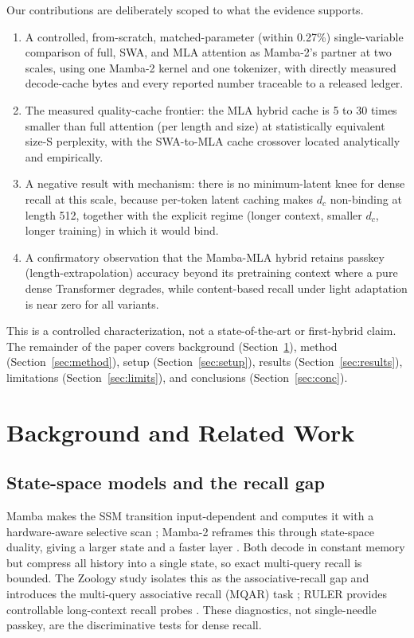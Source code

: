 \documentclass[conference]{IEEEtran}
\begin{document}
Our contributions are deliberately scoped to what the evidence supports.
\begin{enumerate}
\item A controlled, from-scratch, matched-parameter (within 0.27\%) single-variable comparison of full, SWA, and MLA attention as Mamba-2's partner at two scales, using one Mamba-2 kernel and one tokenizer, with directly measured decode-cache bytes and every reported number traceable to a released ledger.
\item The measured quality-cache frontier: the MLA hybrid cache is 5 to 30 times smaller than full attention (per length and size) at statistically equivalent size-S perplexity, with the SWA-to-MLA cache crossover located analytically and empirically.
\item A negative result with mechanism: there is no minimum-latent knee for dense recall at this scale, because per-token latent caching makes $d_c$ non-binding at length 512, together with the explicit regime (longer context, smaller $d_c$, longer training) in which it would bind.
\item A confirmatory observation that the Mamba-MLA hybrid retains passkey (length-extrapolation) accuracy beyond its pretraining context where a pure dense Transformer degrades, while content-based recall under light adaptation is near zero for all variants.
\end{enumerate}
This is a controlled characterization, not a state-of-the-art or first-hybrid claim. The remainder of the paper covers background (Section~\ref{sec:bg}), method (Section~\ref{sec:method}), setup (Section~\ref{sec:setup}), results (Section~\ref{sec:results}), limitations (Section~\ref{sec:limits}), and conclusions (Section~\ref{sec:conc}).

\section{Background and Related Work}
\label{sec:bg}

\subsection{State-space models and the recall gap}
Mamba makes the SSM transition input-dependent and computes it with a hardware-aware selective scan \cite{mamba}; Mamba-2 reframes this through state-space duality, giving a larger state and a faster layer \cite{mamba2}. Both decode in constant memory but compress all history into a single state, so exact multi-query recall is bounded. The Zoology study isolates this as the associative-recall gap and introduces the multi-query associative recall (MQAR) task \cite{zoology}; RULER provides controllable long-context recall probes \cite{ruler}. These diagnostics, not single-needle passkey, are the discriminative tests for dense recall.
\end{document}
